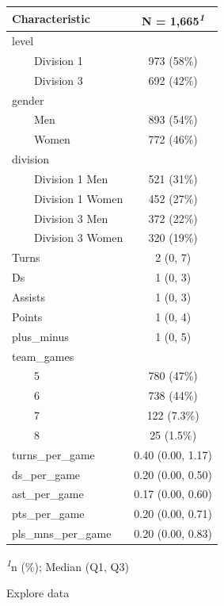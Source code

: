 \documentclass[
  letterpaper,
  DIV=11,
  numbers=noendperiod]{scrartcl}
\begin{document}
\begin{table}
\fontsize{12.0pt}{14.4pt}\selectfont
\begin{tabular*}{\linewidth}{@{\extracolsep{\fill}}lc}
\toprule
\textbf{Characteristic} & \textbf{N = 1,665}\textsuperscript{\textit{1}} \\ 
\midrule\addlinespace[2.5pt]
level &  \\ 
    Division 1 & 973 (58\%) \\ 
    Division 3 & 692 (42\%) \\ 
gender &  \\ 
    Men & 893 (54\%) \\ 
    Women & 772 (46\%) \\ 
division &  \\ 
    Division 1 Men & 521 (31\%) \\ 
    Division 1 Women & 452 (27\%) \\ 
    Division 3 Men & 372 (22\%) \\ 
    Division 3 Women & 320 (19\%) \\ 
Turns & 2 (0, 7) \\ 
Ds & 1 (0, 3) \\ 
Assists & 1 (0, 3) \\ 
Points & 1 (0, 4) \\ 
plus\_minus & 1 (0, 5) \\ 
team\_games &  \\ 
    5 & 780 (47\%) \\ 
    6 & 738 (44\%) \\ 
    7 & 122 (7.3\%) \\ 
    8 & 25 (1.5\%) \\ 
turns\_per\_game & 0.40 (0.00, 1.17) \\ 
ds\_per\_game & 0.20 (0.00, 0.50) \\ 
ast\_per\_game & 0.17 (0.00, 0.60) \\ 
pts\_per\_game & 0.20 (0.00, 0.71) \\ 
pls\_mns\_per\_game & 0.20 (0.00, 0.83) \\ 
\bottomrule
\end{tabular*}
\begin{minipage}{\linewidth}
\textsuperscript{\textit{1}}n (\%); Median (Q1, Q3)\\
\end{minipage}
\end{table}

Explore data
\end{document}
